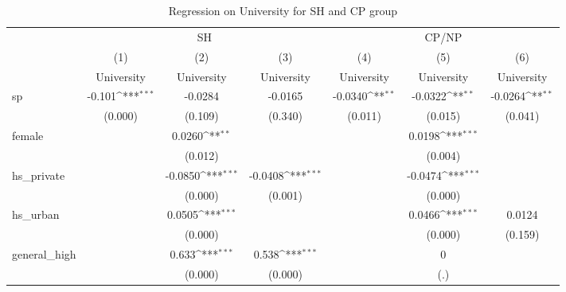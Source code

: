 \documentclass[]{AEA}
\def\sym#1{\ifmmode^{#1}\else\(^{#1}\)\fi}
\begin{document}
    \begin{center}
    \begin{table}
    \caption{Regression on University for SH and CP group}
    \setlength{\tabcolsep}{0.5mm}
    \begin{tabular}{l*{6}c}
    \toprule
    &\multicolumn{3}{c}{SH} &\multicolumn{3}{c}{CP/NP} \\
    \cmidrule(l){2-4}\cmidrule(l){5-7}
    &\multicolumn{1}{c}{(1)}&\multicolumn{1}{c}{(2)}&\multicolumn{1}{c}{(3)}&\multicolumn{1}{c}{(4)}&\multicolumn{1}{c}{(5)}&\multicolumn{1}{c}{(6)} \\
    &\multicolumn{1}{c}{University}&\multicolumn{1}{c}{University}&\multicolumn{1}{c}{University}&\multicolumn{1}{c}{University}&\multicolumn{1}{c}{University}&\multicolumn{1}{c}{University} \\
    \midrule
    sp          &      -0.101\sym{***}&     -0.0284         &     -0.0165         &     -0.0340\sym{**} &     -0.0322\sym{**} &     -0.0264\sym{**} \\
        &     (0.000)         &     (0.109)         &     (0.340)         &     (0.011)         &     (0.015)         &     (0.041)         \\
    [1em]
    female      &                     &      0.0260\sym{**} &                     &                     &      0.0198\sym{***}&                     \\
        &                     &     (0.012)         &                     &                     &     (0.004)         &                     \\
    [1em]
    hs\_private  &                     &     -0.0850\sym{***}&     -0.0408\sym{***}&                     &     -0.0474\sym{***}&                     \\
        &                     &     (0.000)         &     (0.001)         &                     &     (0.000)         &                     \\
    [1em]
    hs\_urban    &                     &      0.0505\sym{***}&                     &                     &      0.0466\sym{***}&      0.0124         \\
        &                     &     (0.000)         &                     &                     &     (0.000)         &     (0.159)         \\
    [1em]
    general\_high&                     &       0.633\sym{***}&       0.538\sym{***}&                     &           0         &                     \\
        &                     &     (0.000)         &     (0.000)         &                     &         (.)         &                     \\

\end{tabular}
\end{table}
\end{center}
\end{document}

